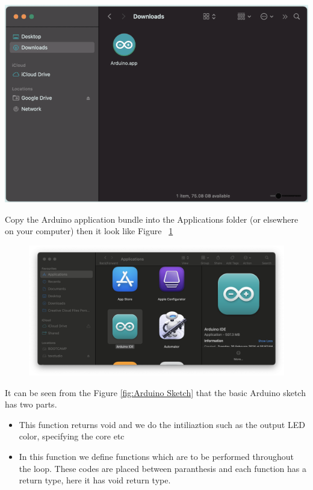 \begin{center}
	\includegraphics[width=0.7\linewidth]{images/ArduinoIDE/OpenTheDownloadFolder.png}
\end{center}

Copy the Arduino application bundle into the Applications folder (or elsewhere on your computer) then it look like Figure ~\ref{CopyApplicationFolder}

\begin{figure}
\begin{center}
	\includegraphics[width=0.7\linewidth]{images/ArduinoIDE/CopyToTheApplicationsFolder.png}
	\label{CopyApplicationFolder}
\end{center}
\end{figure}

It can be seen from the Figure \ref{fig:Arduino Sketch} that the basic Arduino sketch has two parts. 

\begin{itemize}
	\item {} This function returns void and we do the intiliaztion such as the output LED color, specifying the core etc
	\item {} In this function we define functions which are to be performed throughout the loop. These codes are placed between paranthesis {} and each function has a return type, here it has void return type.
\end{itemize}


